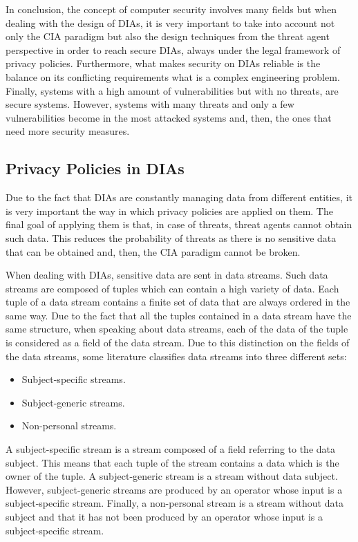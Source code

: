 {In conclusion, the concept of computer security involves many fields but when dealing with the design of DIAs, it is very important to take into account not only the CIA paradigm but also the design techniques from the threat agent perspective in order to reach secure DIAs, always under the legal framework of privacy policies. Furthermore, what makes security on DIAs reliable is the balance on its conflicting requirements what is a complex engineering problem. Finally, systems with a high amount of vulnerabilities but with no threats, are secure systems. However, systems with many threats and only a few vulnerabilities become in the most attacked systems and, then, the ones that need more security measures.
}
\subsection{Privacy Policies in DIAs}

Due to the fact that DIAs are constantly managing data from different entities, it is very important the way in which privacy policies are applied on them. The final goal of applying them is that, in case of threats, threat agents cannot obtain such data. This reduces the probability of threats as there is no sensitive data that can be obtained and, then, the CIA paradigm cannot be broken.

When dealing with DIAs, sensitive data are sent in data streams. Such data streams are composed of tuples which can contain a high variety of data. Each tuple of a data stream contains a finite set of data that are always ordered in the same way. Due to the fact that all the tuples contained in a data stream have the same structure, when speaking about data streams, each of the data of the tuple is considered as a field of the data stream. Due to this distinction on the fields of the data streams, some literature \cite{privacypoliciesarticle} classifies data streams into three different sets:

\begin{itemize}

\item Subject-specific streams.
\item Subject-generic streams.
\item Non-personal streams.

\end{itemize}

A subject-specific stream is a stream composed of a field referring to the data subject. This means that each tuple of the stream contains a data which is the owner of the tuple. A subject-generic stream is a stream without data subject. However, subject-generic streams are produced by an operator whose input is a subject-specific stream. Finally, a non-personal stream is a stream without data subject and that it has not been produced by an operator whose input is a subject-specific stream.

